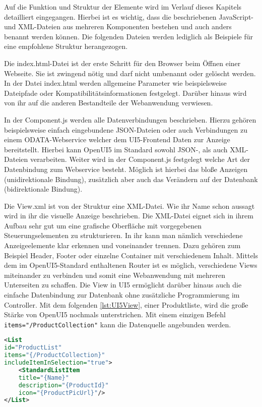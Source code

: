 Auf die Funktion und Struktur der Elemente wird im Verlauf dieses Kapitels detailliert eingegangen. Hierbei ist es wichtig, dass die beschriebenen JavaScript- und XML-Dateien aus mehreren Komponenten bestehen und auch anders benannt werden können. Die folgenden Dateien werden lediglich als Beispiele für eine empfohlene Struktur herangezogen. 

Die index.html-Datei ist der erste Schritt für den Browser beim Öffnen einer Webseite. Sie ist zwingend nötig und darf nicht umbenannt oder gelöscht werden. In der Datei index.html werden allgemeine Parameter wie beispielsweise Dateipfade oder Kompatibilitätsinformationen festgelegt. Darüber hinaus wird von ihr auf die anderen Bestandteile der Webanwendung verwiesen.

In der Component.js werden alle Datenverbindungen beschrieben. Hierzu gehören beispielsweise einfach eingebundene JSON-Dateien oder auch Verbindungen zu einem ODATA-Webservice welcher dem UI5-Frontend Daten zur Anzeige bereitstellt. Hierbei kann OpenUI5 im Standard sowohl JSON-, als auch XML-Dateien verarbeiten. Weiter wird in der Component.js festgelegt welche Art der Datenbindung zum Webservice besteht. Möglich ist hierbei das bloße Anzeigen (unidirektionale Bindung), zusätzlich aber auch das Verändern auf der Datenbank (bidirektionale Bindung).

Die View.xml ist von der Struktur eine XML-Datei. Wie ihr Name schon aussagt wird in ihr die visuelle Anzeige beschrieben. Die XML-Datei eignet sich in ihrem Aufbau sehr gut um eine grafische Oberfläche mit vorgegebenen Steuerungselementen zu strukturieren. In ihr kann man nämlich verschiedene Anzeigeelemente klar erkennen und voneinander trennen. Dazu gehören zum Beispiel Header, Footer oder einzelne Container mit verschiedenem Inhalt. Mittels dem im OpenUI5-Standard enthaltenen Router ist es möglich, verschiedene Views miteinander zu verbinden und somit eine Webanwendung mit mehreren Unterseiten zu schaffen. Die View in UI5 ermöglicht darüber hinaus auch die einfache Datenbindung zur Datenbank ohne zusätzliche Programmierung im Controller. Mit dem folgenden \autoref{lst:UI5View}, einer Produktliste, wird die große Stärke von OpenUI5 nochmals unterstrichen. Mit einem einzigen Befehl \texttt{items="{/ProductCollection}"} kann die Datenquelle angebunden werden.

\begin{lstlisting}[caption=Beispiel OpenUI5 View, label=lst:UI5View, language=XML]
<List
id="ProductList"
items="{/ProductCollection}"
includeItemInSelection="true">
	<StandardListItem
	title="{Name}"
	description="{ProductId}"
	icon="{ProductPicUrl}"/>
</List>
\end{lstlisting}

